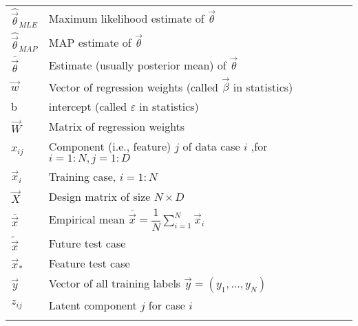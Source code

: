 \begin{longtable}{ll}
$\hat{\vec{\theta}}_{MLE}$ & Maximum likelihood estimate of $\vec{\theta}$\\
$\hat{\vec{\theta}}_{MAP}$ & MAP estimate of $\vec{\theta}$\\
$\bar{\vec{\theta}}$ & Estimate (usually posterior mean) of  $\vec{\theta}$\\
$\vec{w}$ & Vector of regression weights (called $\vec{\beta}$ in statistics)\\
b & intercept (called $\varepsilon$ in statistics)\\
$\vec{W}$ & Matrix of regression weights\\
$x_{ij}$ & Component (i.e., feature) $j$ of data case $i$ ,for $i=1:N ,j=1:D$\\
$\vec{x}_i$ & Training case, $i=1:N$\\
$\vec{X}$ & Design matrix of size $N \times D$\\
$\bar{\vec{x}}$ & Empirical mean $\bar{\vec{x}}=\dfrac{1}{N}\sum_{i=1}^{N} \vec{x}_i$\\
$\tilde{\vec{x}}$ & Future test case\\
$\vec{x}_*$ & Feature test case\\
$\vec{y}$ & Vector of all training labels $\vec{y} =(y_1,...,y_N)$\\
$z_{ij}$ & Latent component $j$ for case $i$\\
\noalign{\smallskip}\hline\noalign{\smallskip}
\end{longtable}